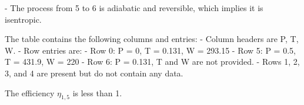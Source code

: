 - The process from 5 to 6 is adiabatic and reversible, which implies it is isentropic.

The table contains the following columns and entries:
- Column headers are P, T, W.
- Row entries are:
  - Row 0: P = 0, T = 0.131, W = 293.15
  - Row 5: P = 0.5, T = 431.9, W = 220
  - Row 6: P = 0.131, T and W are not provided.
- Rows 1, 2, 3, and 4 are present but do not contain any data.

The efficiency \(\eta_{1,5}\) is less than 1.